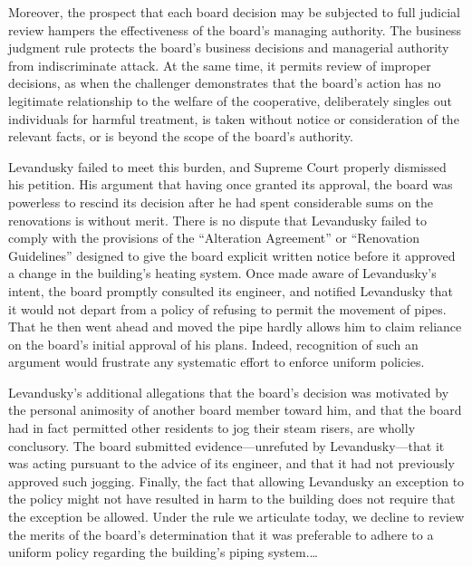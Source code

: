 Moreover, the prospect that each board decision may be subjected to full
judicial review hampers the effectiveness of the board's managing authority. The
business judgment rule protects the board's business decisions and managerial
authority from indiscriminate attack. At the same time, it permits review of
improper decisions, as when the challenger demonstrates that the board's action
has no legitimate relationship to the welfare of the cooperative, deliberately
singles out individuals for harmful treatment, is taken without notice or
consideration of the relevant facts, or is beyond the scope of the board's
authority. 

Levandusky failed to meet this burden, and Supreme Court properly dismissed his
petition. His argument that having once granted its approval, the board was
powerless to rescind its decision after he had spent considerable sums on the
renovations is without merit. There is no dispute that Levandusky failed to
comply with the provisions of the ``Alteration Agreement'' or ``Renovation
Guidelines'' designed to give the board explicit written notice before it
approved a change in the building's heating system. Once made aware of
Levandusky's intent, the board promptly consulted its engineer, and notified
Levandusky that it would not depart from a policy of refusing to permit the
movement of pipes. That he then went ahead and moved the pipe hardly allows him
to claim reliance on the board's initial approval of his plans. Indeed,
recognition of such an argument would frustrate any systematic effort to enforce
uniform policies. 

Levandusky's additional allegations that the board's decision was motivated by
the personal animosity of another board member toward him, and that the board
had in fact permitted other residents to jog their steam risers, are wholly
conclusory. The board submitted evidence---unrefuted by Levandusky---that it was
acting pursuant to the advice of its engineer, and that it had not previously
approved such jogging. Finally, the fact that allowing Levandusky an exception
to the policy might not have resulted in harm to the building does not require
that the exception be allowed. Under the rule we articulate today, we decline to
review the merits of the board's determination that it was preferable to adhere
to a uniform policy regarding the building's piping system.\ldots 

